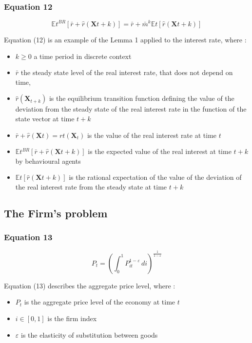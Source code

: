 \documentclass{article}
\begin{document}
\subsubsection*{Equation 12}

\begin{equation}
    \mathbb{E}{t}^{BR}\left[\bar{r}+\hat{r}\left(\bm{X}{t+k}\right)\right]=\bar{r}+\bar{m}^{k}\mathbb{E}{t}\left[\hat{r}(\bm{X}{t+k})\right]
\end{equation}

Equation (12) is an example of the Lemma 1 applied to the interest rate, where :
\begin{itemize}
    \item $k\geq 0$ a time period in discrete context
    \item $\bar{r}$ the steady state level of the real interest rate, that does not depend on time,  
    \item $\hat{r}(\bm{X}_{t+k})$ is the equilibrium transition function defining the value of the deviation from the steady state of the real interest rate in the function of the state vector at time $t+k$
    \item $\bar{r}+\hat{r}(\bm{X}{t})=r{t}(\bm{X}_{t})$ is the value of the real interest rate at time $t$
    \item $\mathbb{E}{t}^{BR}\left[\bar{r}+\hat{r}(\bm{X}{t+k})\right]$ is the expected value of the real interest at time $t+k$ by behavioural agents
    \item $\mathbb{E}{t}\left[\hat{r}(\bm{X}{t+k})\right]$ is the rational expectation of the value of the deviation of the real interest rate from the steady state at time $t+k$
\end{itemize}

\subsection{The Firm's problem}

\subsubsection*{Equation 13}
\begin{equation}
    P_{t}=\left(\int_{0}^{1}P_{it}^{1-\varepsilon}\,di\right)^{\frac{1}{1-\varepsilon}}
\end{equation}

Equation (13) describes the aggregate price level, where : 
\begin{itemize}
    \item $P_{t}$ is the aggregate price level of the economy at time $t$
    \item $i\in\left[0,1\right]$ is the firm index
    \item $\varepsilon$ is the elasticity of substitution between goods
\end{itemize}
\end{document}
